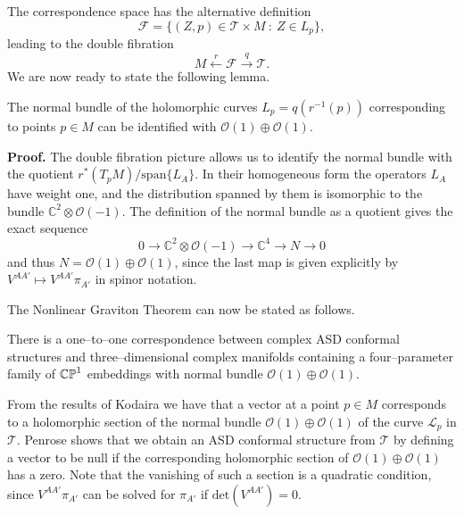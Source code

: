 The correspondence space has the alternative definition
\[
\mathcal{F}=\{(Z,p)\in \mathscr{T}\times M \ :\  Z\in L_p\},
\]
leading to the double fibration
\[
M\xleftarrow{r}\mathcal{F}\xrightarrow{q}\mathscr{T}.
\]
We are now ready to state the following lemma.

\begin{lemma}
The normal bundle of the holomorphic curves $L_p=q(r^{-1}(p))$ corresponding to points $p\in M$ can be identified with $\mathcal{O}(1)\oplus\mathcal{O}(1)$.
\end{lemma}
\noindent
{\bf Proof.} The double fibration picture allows us to identify the normal bundle with the quotient $r^*(T_pM)/\mathrm{span}\{L_A\}$. In their homogeneous form the operators $L_A$ have weight one, and the distribution spanned by them is isomorphic to the bundle $\mathbb{C}^2\otimes\mathcal{O}(-1)$. The definition of the normal bundle as a quotient gives the exact sequence
\[
0\rightarrow \mathbb{C}^2\otimes\mathcal{O}(-1)\rightarrow\mathbb{C}^4\rightarrow N\rightarrow 0
\]
and thus $N=\mathcal{O}(1)\oplus\mathcal{O}(1)$, since the last map is given explicitly by $V^{AA'}\mapsto V^{AA'}\pi_{A'}$ in spinor notation.
\koniec

The Nonlinear Graviton Theorem can now be stated as follows.
\begin{theo}
There is a one--to--one correspondence between complex ASD conformal structures and three--dimensional complex manifolds containing a four--parameter family of $\mathbb{CP}^1$ embeddings with normal bundle $\mathcal{O}(1)\oplus\mathcal{O}(1)$.
\end{theo}
\noindent
From the results of Kodaira \cite{Kodaira} we have that a vector at a point $p\in M$ corresponds to a holomorphic section of the normal bundle $\mathcal{O}(1)\oplus\mathcal{O}(1)$ of the curve $\mathscr{L}_p$ in $\mathscr{T}$. Penrose shows that we obtain an ASD conformal structure from $\mathscr{T}$ by defining a vector to be null if the corresponding holomorphic section of $\mathcal{O}(1)\oplus\mathcal{O}(1)$ has a zero. Note that the vanishing of such a section is a quadratic condition, since $V^{AA'}\pi_{A'}$ can be solved for $\pi_{A'}$ if $\mathrm{det}(V^{AA'})=0$.



